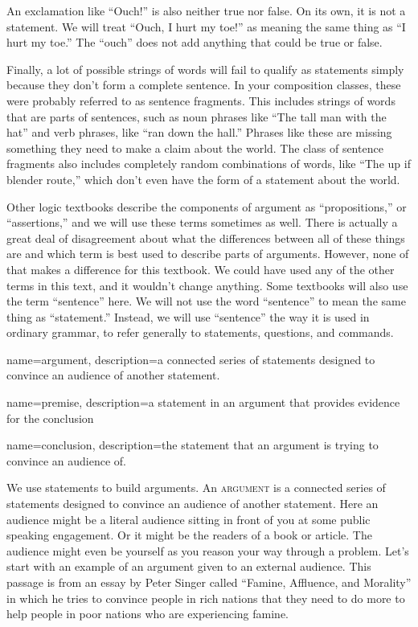 An exclamation like ``Ouch!'' is also neither true nor false. On its own, it is not a statement. We will treat ``Ouch, I hurt my toe!'' as meaning the same thing as ``I hurt my toe.'' The ``ouch'' does not add anything that could be true or false.

Finally, a lot of possible strings of words will fail to qualify as statements simply because they don't form a complete sentence. In your composition classes, these were probably referred to as sentence fragments. This includes strings of words that are parts of sentences, such as noun phrases like ``The tall man with the hat'' and verb phrases, like ``ran down the hall.'' Phrases like these are missing something they need to make a claim about the world. The class of sentence fragments also includes completely random combinations of words, like ``The up if blender route,'' which don't even have the form of a statement about the world.  

Other logic textbooks describe the components of argument as ``propositions,'' or ``assertions,'' and we will use these terms sometimes as well.  There is actually a great deal of disagreement about what the differences between all of these things are and which term is best used to describe parts of arguments. However, none of that makes a difference for this textbook. We could have used any of the other terms in this text, and it wouldn't change anything. Some textbooks will also use the term ``sentence'' here. We will not use the word ``sentence'' to mean the same thing as ``statement.'' Instead, we will use ``sentence'' the way it is used in ordinary grammar, to refer generally to statements, questions, and commands. 

{
name=argument,
description={a connected series of statements designed to convince an audience of another statement.}
}

{
name=premise,
description={a statement in an argument that provides evidence for the conclusion}
}

{
name=conclusion,
description={the statement that an argument is trying to convince an audience of.}
}

 
We use statements to build arguments. An \textsc{\gls{argument}} \label{def:Argument} is a connected series of statements designed to convince an audience of another statement. Here an audience might be a literal audience sitting in front of you at some public speaking engagement. Or it might be the readers of a book or article. The audience might even be yourself as you reason your way through a problem. Let's start with an example of an argument given to an external audience. This passage is from an essay by Peter Singer called ``Famine, Affluence, and Morality'' in which he tries to convince people in rich nations that they need to do more to help people in poor nations who are experiencing famine.

